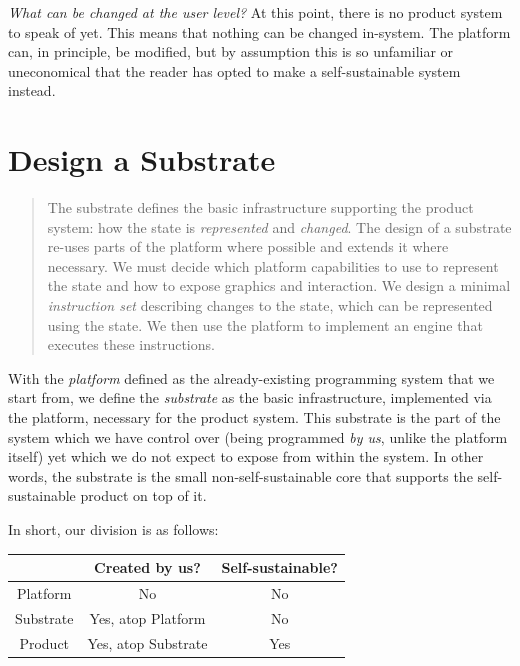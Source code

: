 \documentclass[ twoside,openright,titlepage,numbers=noenddot,headinclude,footinclude,cleardoublepage=empty,abstract=on,
                BCOR=5mm,paper=a4,fontsize=11pt
                ]{scrreprt}
\newcommand{\joel}[1]{}
\theoremstyle{definition}
\begin{document}
\emph{What can be changed at the user level?} At this point, there is no
product system to speak of yet. This means that nothing can be changed
in-system. The platform can, in principle, be modified, but by
assumption this is so unfamiliar or uneconomical that the reader has
opted to make a self-sustainable system instead.

\hypertarget{design-a-substrate}{\section{Design a Substrate}\label{design-a-substrate}}

\begin{quote}
The substrate defines the basic infrastructure supporting the product
system: how the state is \emph{represented} and \emph{changed}. The
design of a substrate re-uses parts of the platform where possible and
extends it where necessary. We must decide which platform capabilities
to use to represent the state and how to expose graphics and
interaction. We design a minimal \emph{instruction set} describing
changes to the state, which can be represented using the state. We then
use the platform to implement an engine that executes these
instructions.
\end{quote}

With the \emph{platform} defined as the already-existing programming
system that we start from, we define the \emph{substrate} as the basic
infrastructure, implemented via the platform, necessary for the product
system. This substrate is the part of the system which we have control
over (being programmed \emph{by us}, unlike the platform itself) yet
which we do not expect to expose from within the system. In other words,
the substrate is the small non-self-sustainable core that supports the
self-sustainable product on top of it.

In short, our division is as follows:

\joel{
* *Platform*: not created by us, not self-sustainable.
* *Substrate*: created by us atop the platform, not self-sustainable.
* *Product*: created by us atop the substrate, self-sustainable.
}

\vspace{1em}
\begin{tabular}{ccc}
\toprule
 & Created by us? & Self-sustainable? \\
\midrule
Platform & No & No \\
Substrate & Yes, atop Platform & No \\
Product & Yes, atop Substrate & Yes \\
\bottomrule
\end{tabular}
\vspace{1em}
\end{document}
